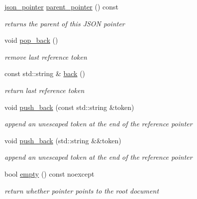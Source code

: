 \begin{DoxyCompactItemize}
\hyperlink{classnlohmann_1_1json__pointer}{json\+\_\+pointer} \hyperlink{classnlohmann_1_1json__pointer_afdaacce1edb7145e0434e014f0e8685a}{parent\+\_\+pointer} () const
\begin{DoxyCompactList}\small\item\em returns the parent of this J\+S\+ON pointer \end{DoxyCompactList}\item 
void \hyperlink{classnlohmann_1_1json__pointer_a4b1ee4d511ca195bed896a3da47e264c}{pop\+\_\+back} ()
\begin{DoxyCompactList}\small\item\em remove last reference token \end{DoxyCompactList}\item 
const std\+::string \& \hyperlink{classnlohmann_1_1json__pointer_a6bd5b554c10f15672135c216893eef31}{back} ()
\begin{DoxyCompactList}\small\item\em return last reference token \end{DoxyCompactList}\item 
void \hyperlink{classnlohmann_1_1json__pointer_a697d12b5bd6205f8866691b166b7c7dc}{push\+\_\+back} (const std\+::string \&token)
\begin{DoxyCompactList}\small\item\em append an unescaped token at the end of the reference pointer \end{DoxyCompactList}\item 
void \hyperlink{classnlohmann_1_1json__pointer_ac228b13596d3c34185da9fe61b570194}{push\+\_\+back} (std\+::string \&\&token)
\begin{DoxyCompactList}\small\item\em append an unescaped token at the end of the reference pointer \end{DoxyCompactList}\item 
bool \hyperlink{classnlohmann_1_1json__pointer_a649252bda4a2e75a0915b11a25d8bcc3}{empty} () const noexcept
\begin{DoxyCompactList}\small\item\em return whether pointer points to the root document \end{DoxyCompactList}\end{DoxyCompactItemize}
